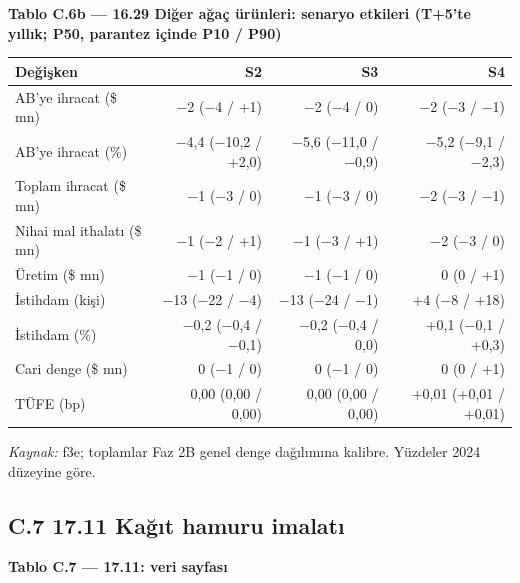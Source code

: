 \endgroup


\textbf{Tablo C.6b --- 16.29 Diğer ağaç ürünleri: senaryo etkileri (T+5'te yıllık; P50, parantez içinde P10 / P90)}

\nopagebreak[4]

\begingroup\gbtablo\small

\begin{longtable}[]{@{}lrrr@{}}
\toprule\noalign{}
\textbf{Değişken} & \textbf{S2} & \textbf{S3} & \textbf{S4} \\
\midrule\noalign{}
\endhead
\bottomrule\noalign{}
\endlastfoot
AB'ye ihracat (\$ mn) & −2 (−4 / +1) & −2 (−4 / 0) & −2 (−3 / −1) \\
AB'ye ihracat (\%) & −4,4 (−10,2 / +2,0) & −5,6 (−11,0 / −0,9) & −5,2 (−9,1 / −2,3) \\
Toplam ihracat (\$ mn) & −1 (−3 / 0) & −1 (−3 / 0) & −2 (−3 / −1) \\
Nihai mal ithalatı (\$ mn) & −1 (−2 / +1) & −1 (−3 / +1) & −2 (−3 / 0) \\
Üretim (\$ mn) & −1 (−1 / 0) & −1 (−1 / 0) & 0 (0 / +1) \\
İstihdam (kişi) & −13 (−22 / −4) & −13 (−24 / −1) & +4 (−8 / +18) \\
İstihdam (\%) & −0,2 (−0,4 / −0,1) & −0,2 (−0,4 / 0,0) & +0,1 (−0,1 / +0,3) \\
Cari denge (\$ mn) & 0 (−1 / 0) & 0 (−1 / 0) & 0 (0 / +1) \\
TÜFE (bp) & 0,00 (0,00 / 0,00) & 0,00 (0,00 / 0,00) & +0,01 (+0,01 / +0,01) \\
\end{longtable}

\endgroup

\emph{Kaynak:} \etiketT{} f3e; toplamlar Faz 2B genel denge dağılımına kalibre. Yüzdeler 2024 düzeyine göre.

\hypertarget{nace_kartlar_16-18-c7-1711-kaux11fux131t-hamuru-imalatux131}{%
\subsection{C.7 17.11 Kağıt hamuru imalatı}\label{nace_kartlar_16-18-c7-1711-kaux11fux131t-hamuru-imalatux131}}


\textbf{Tablo C.7 --- 17.11: veri sayfası}

\nopagebreak[4]

\begingroup\gbtablo\small

